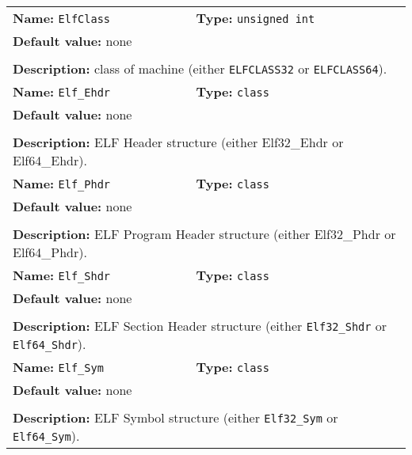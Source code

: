 \begin{center}
\begin{tabular}{|p{7.5cm}|p{7.5cm}|}
		\hline
		\multicolumn{1}{|p{7.5cm}}{\textbf{Name:} \texttt{ElfClass}} & \multicolumn{1}{p{7.5cm}|}{\textbf{Type:} \texttt{unsigned int}}\\
		\multicolumn{2}{|p{15cm}|}{\textbf{Default value:} none}\\
		\multicolumn{2}{|l|}{}\\
		\multicolumn{2}{|p{15cm}|}{\textbf{Description:} \newline class of machine (either \texttt{ELFCLASS32} or \texttt{ELFCLASS64}).}\\
		\hline
		\multicolumn{1}{|p{7.5cm}}{\textbf{Name:} \texttt{Elf\_Ehdr}} & \multicolumn{1}{p{7.5cm}|}{\textbf{Type:} \texttt{class}}\\
		\multicolumn{2}{|p{15cm}|}{\textbf{Default value:} none}\\
		\multicolumn{2}{|l|}{}\\
		\multicolumn{2}{|p{15cm}|}{\textbf{Description:} \newline ELF Header structure (either Elf32\_Ehdr or Elf64\_Ehdr).}\\
		\hline
		\multicolumn{1}{|p{7.5cm}}{\textbf{Name:} \texttt{Elf\_Phdr}} & \multicolumn{1}{p{7.5cm}|}{\textbf{Type:} \texttt{class}}\\
		\multicolumn{2}{|p{15cm}|}{\textbf{Default value:} none}\\
		\multicolumn{2}{|l|}{}\\
		\multicolumn{2}{|p{15cm}|}{\textbf{Description:} \newline ELF Program Header structure (either Elf32\_Phdr or Elf64\_Phdr).}\\
		\hline
		\multicolumn{1}{|p{7.5cm}}{\textbf{Name:} \texttt{Elf\_Shdr}} & \multicolumn{1}{p{7.5cm}|}{\textbf{Type:} \texttt{class}}\\
		\multicolumn{2}{|p{15cm}|}{\textbf{Default value:} none}\\
		\multicolumn{2}{|l|}{}\\
		\multicolumn{2}{|p{15cm}|}{\textbf{Description:} \newline ELF Section Header structure (either \texttt{Elf32\_Shdr} or \texttt{Elf64\_Shdr}).}\\
		\hline
		\multicolumn{1}{|p{7.5cm}}{\textbf{Name:} \texttt{Elf\_Sym}} & \multicolumn{1}{p{7.5cm}|}{\textbf{Type:} \texttt{class}}\\
		\multicolumn{2}{|p{15cm}|}{\textbf{Default value:} none}\\
		\multicolumn{2}{|l|}{}\\
		\multicolumn{2}{|p{15cm}|}{\textbf{Description:} \newline ELF Symbol structure (either \texttt{Elf32\_Sym} or \texttt{Elf64\_Sym}).}\\
		\hline
	\end{tabular}
\end{center}

